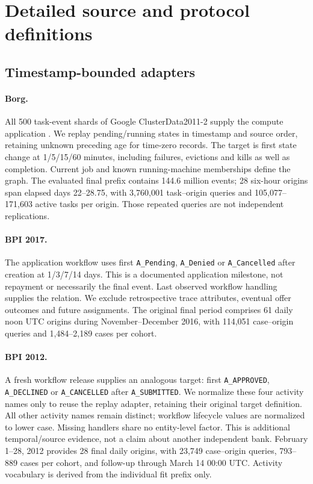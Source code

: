 \section{Detailed source and protocol definitions}
\label{app:design}
\subsection{Timestamp-bounded adapters}
\paragraph{Borg.}
All 500 task-event shards of Google ClusterData2011-2 supply the compute
application \citep{google2011}. We replay pending/running states in timestamp
and source order, retaining unknown preceding age for time-zero records.
The target is first state change at 1/5/15/60 minutes, including failures,
evictions and kills as well as completion. Current job and known
running-machine memberships define the graph. The evaluated final prefix
contains 144.6 million events; 28 six-hour origins span elapsed days
22--28.75, with 3,760,001 task--origin queries and 105,077--171,603 active tasks
per origin. Those repeated queries are not independent replications.

\paragraph{BPI 2017.}
The application workflow \citep{vandongen2017} uses first
\texttt{A\_Pending}, \texttt{A\_Denied} or \texttt{A\_Cancelled} after creation
at 1/3/7/14 days. This is a documented application milestone, not repayment
or necessarily the final event. Last observed workflow handling supplies the
relation. We exclude retrospective trace attributes, eventual offer outcomes
and future assignments. The original final period comprises 61 daily noon
UTC origins during November--December 2016, with 114,051 case--origin queries
and 1,484--2,189 cases per cohort.

\paragraph{BPI 2012.}
A fresh workflow release \citep{vandongen2012} supplies an analogous target:
first \texttt{A\_APPROVED}, \texttt{A\_DECLINED} or \texttt{A\_CANCELLED}
after \texttt{A\_SUBMITTED}. We normalize these four activity names only to
reuse the replay adapter, retaining their original target definition. All
other activity names remain distinct; workflow lifecycle values are
normalized to lower case. Missing handlers share no entity-level factor.
This is additional temporal/source evidence, not a claim about another
independent bank. February 1--28, 2012 provides 28 final daily origins, with
23,749 case--origin queries, 793--889 cases per cohort, and
follow-up through March 14 00:00 UTC. Activity vocabulary is derived from
the individual fit prefix only.

